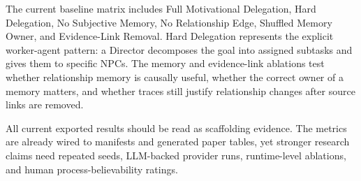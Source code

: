 The current baseline matrix includes Full Motivational Delegation, Hard Delegation, No Subjective Memory, No Relationship Edge, Shuffled Memory Owner, and Evidence-Link Removal. Hard Delegation represents the explicit worker-agent pattern: a Director decomposes the goal into assigned subtasks and gives them to specific NPCs. The memory and evidence-link ablations test whether relationship memory is causally useful, whether the correct owner of a memory matters, and whether traces still justify relationship changes after source links are removed.

All current exported results should be read as scaffolding evidence. The metrics are already wired to manifests and generated paper tables, yet stronger research claims need repeated seeds, LLM-backed provider runs, runtime-level ablations, and human process-believability ratings.

